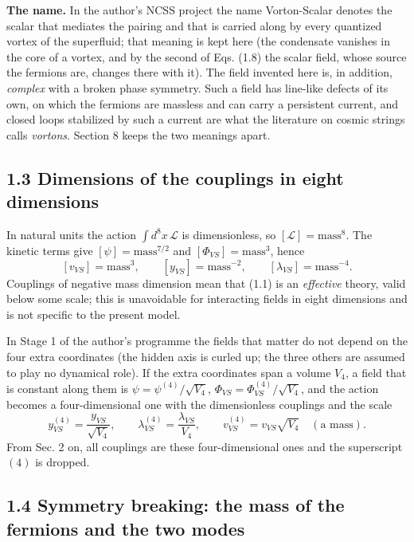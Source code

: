 \documentclass[
  10pt,
]{article}
\begin{document}
\textbf{The name.} In the author's NCSS project the name Vorton-Scalar
denotes the scalar that mediates the pairing and that is carried along
by every quantized vortex of the superfluid; that meaning is kept here
(the condensate vanishes in the core of a vortex, and by the second of
Eqs. (1.8) the scalar field, whose source the fermions are, changes
there with it). The field invented here is, in addition, \emph{complex}
with a broken phase symmetry. Such a field has line-like defects of its
own, on which the fermions are massless and can carry a persistent
current, and closed loops stabilized by such a current are what the
literature on cosmic strings calls \emph{vortons}. Section 8 keeps the
two meanings apart.

\hypertarget{dimensions-of-the-couplings-in-eight-dimensions}{%
\subsection{1.3 Dimensions of the couplings in eight
dimensions}\label{dimensions-of-the-couplings-in-eight-dimensions}}

In natural units the action \(\int d^8x\,\mathcal L\) is dimensionless,
so \([\mathcal L]=\text{mass}^8\). The kinetic terms give
\([\psi]=\text{mass}^{7/2}\) and \([\Phi_{VS}]=\text{mass}^{3}\), hence
\[[v_{VS}]=\text{mass}^{3},\qquad[y_{VS}]=\text{mass}^{-2},\qquad[\lambda_{VS}]=\text{mass}^{-4}.\]
Couplings of negative mass dimension mean that (1.1) is an
\emph{effective} theory, valid below some scale; this is unavoidable for
interacting fields in eight dimensions and is not specific to the
present model.

In Stage 1 of the author's programme the fields that matter do not
depend on the four extra coordinates (the hidden axis is curled up; the
three others are assumed to play no dynamical role). If the extra
coordinates span a volume \(V_4\), a field that is constant along them
is \(\psi=\psi^{(4)}/\sqrt{V_4}\),
\(\Phi_{VS}=\Phi_{VS}^{(4)}/\sqrt{V_4}\), and the action becomes a
four-dimensional one with the dimensionless couplings and the scale
\[y_{VS}^{(4)}=\frac{y_{VS}}{\sqrt{V_4}},\qquad\lambda_{VS}^{(4)}=\frac{\lambda_{VS}}{V_4},\qquad v_{VS}^{(4)}=v_{VS}\sqrt{V_4}\quad(\text{a mass}).\]
From Sec. 2 on, all couplings are these four-dimensional ones and the
superscript \((4)\) is dropped.

\hypertarget{symmetry-breaking-the-mass-of-the-fermions-and-the-two-modes}{%
\subsection{1.4 Symmetry breaking: the mass of the fermions and the two
modes}\label{symmetry-breaking-the-mass-of-the-fermions-and-the-two-modes}}
\end{document}
